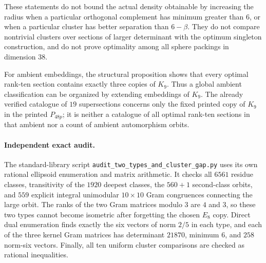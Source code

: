 These statements do not bound the actual density obtainable by increasing
the radius when a particular orthogonal complement has minimum greater
than $6$, or when a particular cluster has better separation than
$6-\beta$. They do not compare nontrivial clusters over sections of
larger determinant with the optimum singleton construction, and do not
prove optimality among all sphere packings in dimension $38$.

For ambient embeddings, the structural proposition shows that every
optimal rank-ten section contains exactly three copies of $K_9$.
Thus a global ambient classification can be organized by extending
embeddings of $K_9$. The already verified catalogue of $19$ supersections
concerns only the fixed printed copy of $K_9$ in the printed $P_{48p}$;
it is neither a catalogue of all optimal rank-ten sections in that ambient
nor a count of ambient automorphism orbits.

\paragraph{Independent exact audit.}
The standard-library script
\texttt{audit\_two\_types\_and\_cluster\_gap.py}
uses its own rational ellipsoid enumeration and matrix arithmetic.
It checks all $6561$ residue classes, transitivity of the $1920$ deepest
classes, the $560+1$ second-class orbits, and $559$ explicit integral
unimodular $10\times10$ Gram congruences connecting the large orbit.
The ranks of the two Gram matrices modulo $3$ are $4$ and $3$, so these
two types cannot become isometric after forgetting the chosen $E_8$ copy.
Direct dual enumeration finds exactly the six vectors of norm $2/5$ in
each type, and each of the three kernel Gram matrices has determinant
$21870$, minimum $6$, and $258$ norm-six vectors. Finally, all ten
uniform cluster comparisons are checked as rational inequalities.

